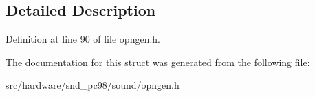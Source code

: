 \subsection{Detailed Description}


Definition at line 90 of file opngen.\-h.



The documentation for this struct was generated from the following file\-:\begin{DoxyCompactItemize}
\item 
src/hardware/snd\-\_\-pc98/sound/opngen.\-h\end{DoxyCompactItemize}
